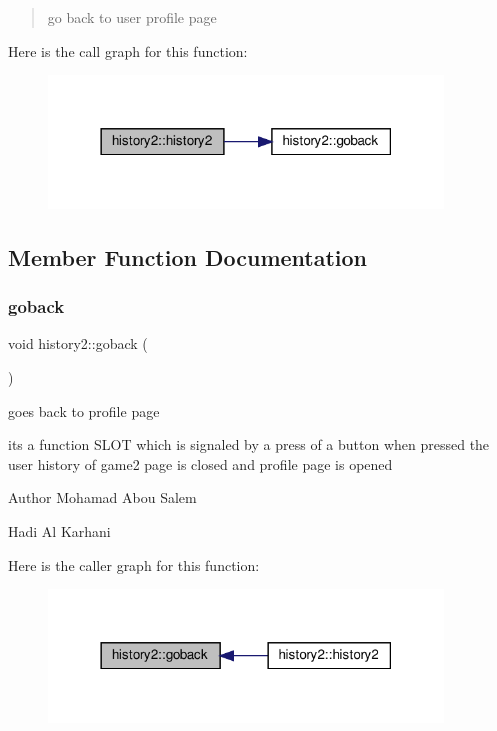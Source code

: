\begin{quote}
go back to user profile page \end{quote}
Here is the call graph for this function\+:
\nopagebreak
\begin{figure}[H]
\begin{center}
\leavevmode
\includegraphics[width=297pt]{classhistory2_aa90b74bf7753c2814827754f886830f6_cgraph}
\end{center}
\end{figure}


\subsection{Member Function Documentation}
\mbox{\label{classhistory2_a7c8bc802fee335ca7eb2ecf3cc441034}} 
\subsubsection{\texorpdfstring{goback}{goback}}
{\footnotesize\ttfamily void history2\+::goback (\begin{DoxyParamCaption}{ }\end{DoxyParamCaption})\hspace{0.3cm}{\ttfamily [slot]}}



goes back to profile page 

its a function S\+L\+OT which is signaled by a press of a button when pressed the user history of game2 page is closed and profile page is opened

\begin{DoxyAuthor}{Author}
Mohamad Abou Salem 

Hadi Al Karhani 
\end{DoxyAuthor}
Here is the caller graph for this function\+:
\nopagebreak
\begin{figure}[H]
\begin{center}
\leavevmode
\includegraphics[width=297pt]{classhistory2_a7c8bc802fee335ca7eb2ecf3cc441034_icgraph}
\end{center}
\end{figure}


